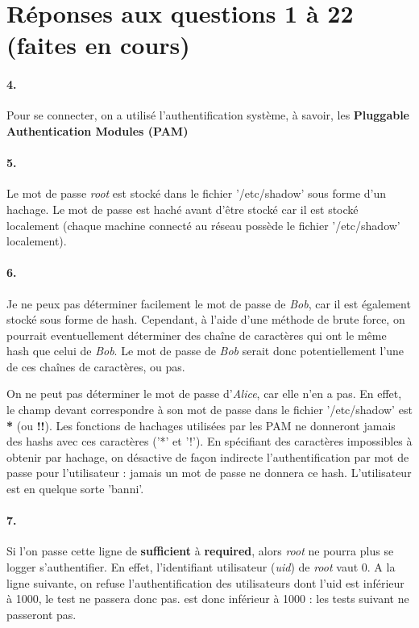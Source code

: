 \documentclass[10pt]{article}
\begin{document}
    \tableofcontents

    \section{Réponses aux questions 1 à 22 (faites en cours)}

        \paragraph{4.} Pour se connecter, on a utilisé l'authentification système, à savoir, les \textbf{Pluggable Authentication Modules (PAM)}
        
        \paragraph{5.} Le mot de passe \textit{root} est stocké dans le fichier '/etc/shadow' sous forme d'un hachage. Le mot de passe est haché avant d'être stocké car il est stocké localement (chaque machine connecté au réseau possède le fichier '/etc/shadow' localement).
        
        \paragraph{6.} Je ne peux pas déterminer facilement le mot de passe de \textit{Bob}, car il est également stocké sous forme de hash. Cependant, à l'aide d'une méthode de brute force, on pourrait eventuellement déterminer des chaîne de caractères qui ont le même hash que celui de \textit{Bob}. Le mot de passe de \textit{Bob} serait donc potentiellement l'une de ces chaînes de caractères, ou pas.
        
        On ne peut pas déterminer le mot de passe d'\textit{Alice}, car elle n'en a pas.
        En effet, le champ devant correspondre à son mot de passe dans le fichier '/etc/shadow' est \textbf{*} (ou \textbf{!!}).
        Les fonctions de hachages utilisées par les PAM ne donneront jamais des hashs avec ces caractères ('*' et '!').
        En spécifiant des caractères impossibles à obtenir par hachage, on désactive de façon indirecte l'authentification par mot de passe pour l'utilisateur : jamais un mot de passe ne donnera ce hash.
        L'utilisateur est en quelque sorte 'banni'.

        \paragraph{7.} Si l'on passe cette ligne de \textbf{sufficient} à \textbf{required}, alors \textit{root} ne pourra plus se logger s'authentifier.
        En effet, l'identifiant utilisateur (\textit{uid}) de \textit{root} vaut 0.
        A la ligne suivante, on refuse l'authentification des utilisateurs dont l'uid est inférieur à 1000, le test ne passera donc pas.
        est donc inférieur à 1000 : les tests suivant ne passeront pas.
        
\end{document}
